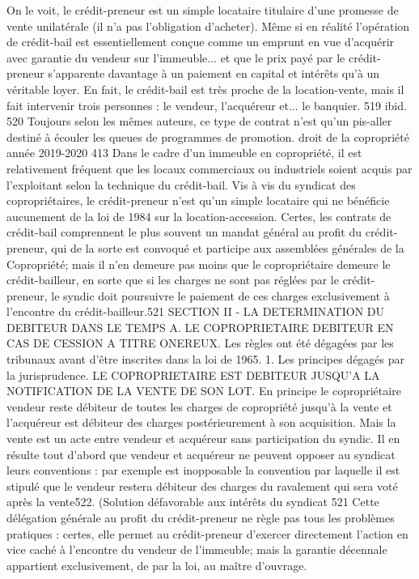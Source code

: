 On le voit, le crédit-preneur est un simple locataire titulaire d’une promesse de vente unilatérale (il n’a pas l’obligation d’acheter). Même si en réalité l’opération de crédit-bail est essentiellement conçue comme un emprunt en vue d’acquérir avec garantie du vendeur sur l’immeuble... et que le prix payé par le crédit-preneur s’apparente davantage à un paiement en capital et intérêts qu’à un véritable loyer.
En fait, le crédit-bail est très proche de la location-vente, mais il fait intervenir trois personnes : le vendeur, l’acquéreur et... le banquier.
519 ibid.
520 Toujours selon les mêmes auteurs, ce type de contrat n’est qu’un pis-aller destiné à écouler les queues de programmes de promotion.
droit de la copropriété année 2019-2020
413
Dans le cadre d’un immeuble en copropriété, il est relativement fréquent que les locaux commerciaux ou industriels soient acquis par l’exploitant selon la technique du crédit-bail.
Vis à vis du syndicat des copropriétaires, le crédit-preneur n’est qu’un simple locataire qui ne bénéficie aucunement de la loi de 1984 sur la location-accession.
Certes, les contrats de crédit-bail comprennent le plus souvent un mandat général au profit du crédit-preneur, qui de la sorte est convoqué et participe aux assemblées générales de la Copropriété; mais il n’en demeure pas moins que le copropriétaire demeure le crédit-bailleur, en sorte que si les charges ne sont pas réglées par le crédit-preneur, le syndic doit poursuivre le paiement de ces charges exclusivement à l’encontre du crédit-bailleur.521
SECTION II - LA DETERMINATION DU DEBITEUR DANS LE TEMPS
A. LE COPROPRIETAIRE DEBITEUR EN CAS DE CESSION A TITRE ONEREUX.
Les règles ont été dégagées par les tribunaux avant d’être inscrites dans la loi de 1965.
1. Les principes dégagés par la jurisprudence.
LE COPROPRIETAIRE EST DEBITEUR JUSQU’A LA NOTIFICATION DE LA VENTE DE SON LOT.
En principe le copropriétaire vendeur reste débiteur de toutes les charges de copropriété jusqu'à la vente et l'acquéreur est débiteur des charges postérieurement à son acquisition.
Mais la vente est un acte entre vendeur et acquéreur sans participation du syndic.
Il en résulte tout d’abord que vendeur et acquéreur ne peuvent opposer au syndicat leurs conventions : par exemple est inopposable la convention par laquelle il est stipulé que le vendeur restera débiteur des charges du ravalement qui sera voté après la vente522. (Solution défavorable aux intérêts du syndicat
521 Cette délégation générale au profit du crédit-preneur ne règle pas tous les problèmes pratiques : certes, elle permet au crédit-preneur d’exercer directement l’action en vice caché à l’encontre du vendeur de l’immeuble; mais la garantie décennale appartient exclusivement, de par la loi, au maître d’ouvrage.

